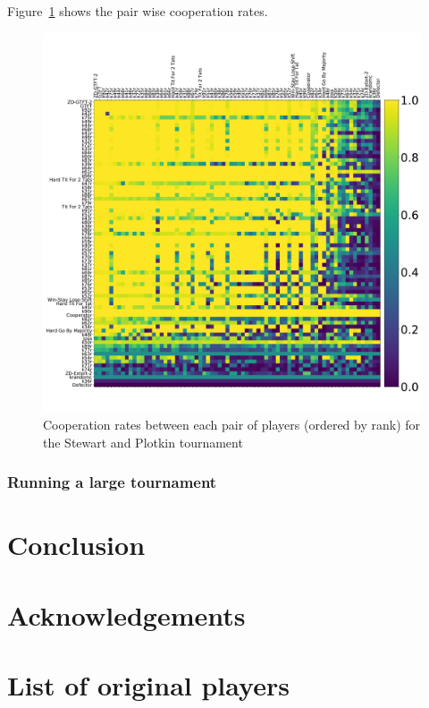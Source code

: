 \documentclass{article}
\begin{document}
Figure~\ref{fig:sp_tournament_cooperation_rates} shows the pair wise
cooperation rates.

\begin{figure}[!hbtp]
    \centering
    \includegraphics[width=.8\textwidth]{assets/sp_tournament_cooperation_rates}
    \caption{Cooperation rates between each pair of players (ordered by rank)
    for the Stewart and Plotkin tournament}
    \label{fig:sp_tournament_cooperation_rates}
\end{figure}



\subsubsection{Running a large tournament}\label{sec:run_with_everyone}


\section{Conclusion}\label{sec:conclusion}

\section*{Acknowledgements}





\appendix

\section{List of original players}\label{app:list_of_original_players}


\begin{multicols}{2}
    \begin{enumerate}
            
    \end{enumerate}
\end{multicols}
\end{document}
